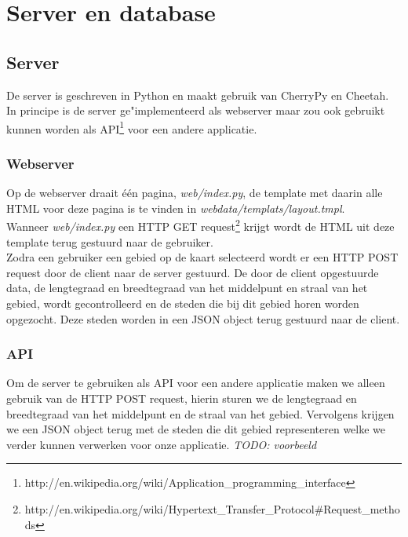 \documentclass[twoside,openright]{uva-bachelor-thesis}
\begin{document}
	\section{Server en database}
		\subsection{Server}
		De server is geschreven in Python en maakt gebruik van CherryPy en Cheetah. In principe is de server ge"implementeerd als webserver maar zou ook gebruikt kunnen worden als API\footnote{http://en.wikipedia.org/wiki/Application\_programming\_interface} voor een andere applicatie.
		
		\subsubsection{Webserver}
		Op de webserver draait \'e\'en pagina, \textit{web/index.py}, de template met daarin alle HTML voor deze pagina is te vinden in \textit{webdata/templats/layout.tmpl}.
		\\[0.5cm]
		Wanneer \textit{web/index.py} een HTTP GET request\footnote{http://en.wikipedia.org/wiki/Hypertext\_Transfer\_Protocol\#Request\_methods} krijgt wordt de HTML uit deze template terug gestuurd naar de gebruiker.
		\\[0.5cm]
		Zodra een gebruiker een gebied op de kaart selecteerd wordt er een HTTP POST request door de client naar de server gestuurd. De door de client opgestuurde data, de lengtegraad en breedtegraad van het middelpunt en straal van het gebied, wordt gecontrolleerd en de steden die bij dit gebied horen worden opgezocht. Deze steden worden in een JSON object terug gestuurd naar de client.
		\subsubsection{API}
		Om de server te gebruiken als API voor een andere applicatie maken we alleen gebruik van de HTTP POST request, hierin sturen we de lengtegraad en breedtegraad van het middelpunt en de straal van het gebied. Vervolgens krijgen we een JSON object terug met de steden die dit gebied representeren welke we verder kunnen verwerken voor onze applicatie.
		\textit{TODO: voorbeeld}
\end{document}
